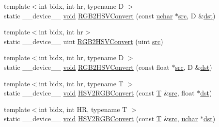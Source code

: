 \begin{DoxyCompactItemize}
\item 
{\footnotesize template$<$int bidx, int hr, typename D $>$ }\\static \-\_\-\-\_\-device\-\_\-\-\_\- \hyperlink{legacy_8hpp_a8bb47f092d473522721002c86c13b94e}{void} \hyperlink{namespacecv_1_1gpu_1_1device_1_1color__detail_ae8bf2db64c21d855b713ed013aa35c42}{R\-G\-B2\-H\-S\-V\-Convert} (const \hyperlink{core_2types__c_8h_a65f85814a8290f9797005d3b28e7e5fc}{uchar} $\ast$\hyperlink{legacy_8hpp_a371cd109b74033bc4366f584edd3dacc}{src}, D \&\hyperlink{photo__c_8h_aed13e2a25279b24dc954073233fef7a5}{dst})
\item 
{\footnotesize template$<$int bidx, int hr$>$ }\\static \-\_\-\-\_\-device\-\_\-\-\_\- uint \hyperlink{namespacecv_1_1gpu_1_1device_1_1color__detail_a8a9840cc45eea2cc14eacb9f328edaac}{R\-G\-B2\-H\-S\-V\-Convert} (uint \hyperlink{legacy_8hpp_a371cd109b74033bc4366f584edd3dacc}{src})
\item 
{\footnotesize template$<$int bidx, int hr, typename D $>$ }\\static \-\_\-\-\_\-device\-\_\-\-\_\- \hyperlink{legacy_8hpp_a8bb47f092d473522721002c86c13b94e}{void} \hyperlink{namespacecv_1_1gpu_1_1device_1_1color__detail_ad5e548693abf77a4cd5cdafed980cf16}{R\-G\-B2\-H\-S\-V\-Convert} (const float $\ast$\hyperlink{legacy_8hpp_a371cd109b74033bc4366f584edd3dacc}{src}, D \&\hyperlink{photo__c_8h_aed13e2a25279b24dc954073233fef7a5}{dst})
\item 
{\footnotesize template$<$int bidx, int hr, typename T $>$ }\\static \-\_\-\-\_\-device\-\_\-\-\_\- \hyperlink{legacy_8hpp_a8bb47f092d473522721002c86c13b94e}{void} \hyperlink{namespacecv_1_1gpu_1_1device_1_1color__detail_a9f8b5d949c114851543e66fe11e33b5b}{H\-S\-V2\-R\-G\-B\-Convert} (const \hyperlink{calib3d_8hpp_a3efb9551a871ddd0463079a808916717}{T} \&\hyperlink{legacy_8hpp_a371cd109b74033bc4366f584edd3dacc}{src}, float $\ast$\hyperlink{photo__c_8h_aed13e2a25279b24dc954073233fef7a5}{dst})
\item 
{\footnotesize template$<$int bidx, int H\-R, typename T $>$ }\\static \-\_\-\-\_\-device\-\_\-\-\_\- \hyperlink{legacy_8hpp_a8bb47f092d473522721002c86c13b94e}{void} \hyperlink{namespacecv_1_1gpu_1_1device_1_1color__detail_a917c0ec93598f1cc19e5c867d24b4385}{H\-S\-V2\-R\-G\-B\-Convert} (const \hyperlink{calib3d_8hpp_a3efb9551a871ddd0463079a808916717}{T} \&\hyperlink{legacy_8hpp_a371cd109b74033bc4366f584edd3dacc}{src}, \hyperlink{core_2types__c_8h_a65f85814a8290f9797005d3b28e7e5fc}{uchar} $\ast$\hyperlink{photo__c_8h_aed13e2a25279b24dc954073233fef7a5}{dst})

\end{DoxyCompactItemize}
